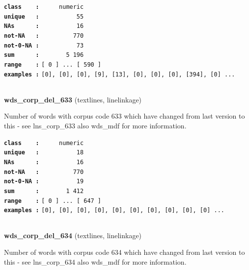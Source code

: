 \documentclass[]{article}
\begin{document}
\textbf{\texttt{class\ \ \ \ :}} \texttt{~~~~~numeric}\\
\textbf{\texttt{unique\ \ \ :}} \texttt{~~~~~~~~~~55}\\
\textbf{\texttt{NAs\ \ \ \ \ \ :}} \texttt{~~~~~~~~~~16}\\
\textbf{\texttt{not-NA\ \ \ :}} \texttt{~~~~~~~~~770}\\
\textbf{\texttt{not-0-NA\ :}} \texttt{~~~~~~~~~~73}\\
\textbf{\texttt{sum\ \ \ \ \ \ :}} \texttt{~~~~~~~5~196}\\
\textbf{\texttt{range\ \ \ \ :}}
\texttt{{[}\ 0\ {]}\ ...\ {[}\ 590\ {]}}\\
\textbf{\texttt{examples\ :}}
\texttt{{[}0{]},\ {[}0{]},\ {[}0{]},\ {[}9{]},\ {[}13{]},\ {[}0{]},\ {[}0{]},\ {[}0{]},\ {[}394{]},\ {[}0{]}\ ...}\\

~

\textbf{wds\_corp\_del\_633} (textlines, linelinkage)

Number of words with corpus code 633 which have changed from last
version to this - see lns\_corp\_633 also wds\_mdf for more information.

\textbf{\texttt{class\ \ \ \ :}} \texttt{~~~~~numeric}\\
\textbf{\texttt{unique\ \ \ :}} \texttt{~~~~~~~~~~18}\\
\textbf{\texttt{NAs\ \ \ \ \ \ :}} \texttt{~~~~~~~~~~16}\\
\textbf{\texttt{not-NA\ \ \ :}} \texttt{~~~~~~~~~770}\\
\textbf{\texttt{not-0-NA\ :}} \texttt{~~~~~~~~~~19}\\
\textbf{\texttt{sum\ \ \ \ \ \ :}} \texttt{~~~~~~~1~412}\\
\textbf{\texttt{range\ \ \ \ :}}
\texttt{{[}\ 0\ {]}\ ...\ {[}\ 647\ {]}}\\
\textbf{\texttt{examples\ :}}
\texttt{{[}0{]},\ {[}0{]},\ {[}0{]},\ {[}0{]},\ {[}0{]},\ {[}0{]},\ {[}0{]},\ {[}0{]},\ {[}0{]},\ {[}0{]}\ ...}\\

~

\textbf{wds\_corp\_del\_634} (textlines, linelinkage)

Number of words with corpus code 634 which have changed from last
version to this - see lns\_corp\_634 also wds\_mdf for more information.
\end{document}
